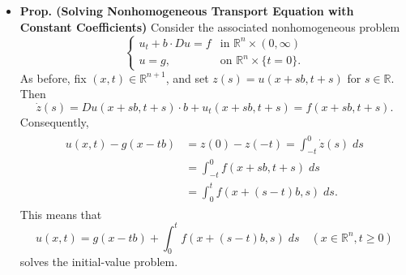 \documentclass{article}
\begin{document}
\begin{itemize}
		\item \textbf{Prop. (Solving Nonhomogeneous Transport Equation with Constant Coefficients)} Consider the associated nonhomogeneous problem 
		\begin{equation*}
			\begin{cases}
				u_{t} + b \cdot Du = f & \text{in $\mathbb{R}^n \times (0,\infty)$} \\ 
				u = g, & \text{on $\mathbb{R}^n \times \{t = 0\}$}. 
			\end{cases}
		\end{equation*}
		As before, fix $(x, t) \in \mathbb{R}^{n + 1}$, and set $z(s) = u(x + sb, t + s)$ for $s \in \mathbb{R}$. Then 
		\begin{equation*}
			\dot{z}(s) = Du(x + sb, t + s) \cdot b + u_{t}(x + sb, t + s) = f(x + sb, t + s). 
		\end{equation*}
		Consequently, 
		\begin{align*}
			\begin{split}
				u(x, t) - g(x - tb) &= z(0) - z(-t) = \int_{-t}^{0}\dot{z}(s)\;ds \\
				&= \int_{-t}^{0}f(x + sb, t + s)\;ds \\
				&= \int_{0}^{t}f(x + (s - t)b, s)\;ds. 
			\end{split}
		\end{align*}
		This means that 
		\begin{equation*}
			u(x, t) = g(x -tb) + \int_{0}^{t}f(x + (s -t)b, s)\;ds \quad (x \in \mathbb{R}^{n}, t \geq 0)
		\end{equation*}
		solves the initial-value problem. 
	\end{itemize}
	
\end{document}
